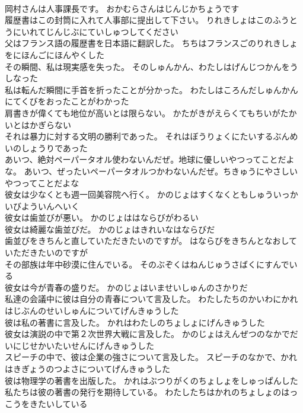 \documentclass[8pt]{extreport}
\begin{document}
\begin{CJK}{UTF8}{min}
\\	岡村さんは人事課長です。	おかむらさんはじんじかちょうです 
\\	履歴書はこの封筒に入れて人事部に提出して下さい。	りれきしょはこのふうとうにいれてじんじぶにていしゅつしてください 
\\	父はフランス語の履歴書を日本語に翻訳した。	ちちはフランスごのりれきしょをにほんごにほんやくした 
\\	その瞬間、私は現実感を失った。	そのしゅんかん、わたしはげんじつかんをうしなった 
\\	私は転んだ瞬間に手首を折ったことが分かった。	わたしはころんだしゅんかんにてくびをおったことがわかった 
\\	肩書きが偉くても地位が高いとは限らない。	かたがきがえらくてもちいがたかいとはかぎらない 
\\	それは暴力に対する文明の勝利であった。	それはぼうりょくにたいするぶんめいのしょうりであった 
\\	あいつ、絶対ペーパータオル使わないんだぜ。地球に優しいやつってことだよな。	あいつ、ぜったいペーパータオルつかわないんだぜ。ちきゅうにやさしいやつってことだよな 
\\	彼女は少なくとも週一回美容院へ行く。	かのじょはすくなくともしゅういっかいびよういんへいく 
\\	彼女は歯並びが悪い。	かのじょははならびがわるい 
\\	彼女は綺麗な歯並びだ。	かのじょはきれいなはならびだ 
\\	歯並びをきちんと直していただきたいのですが。	はならびをきちんとなおしていただきたいのですが 
\\	その部族は年中砂漠に住んでいる。	そのぶぞくはねんじゅうさばくにすんでいる 
\\	彼女は今が青春の盛りだ。	かのじょはいませいしゅんのさかりだ 
\\	私達の会議中に彼は自分の青春について言及した。	わたしたちのかいわにかれはじぶんのせいしゅんについてげんきゅうした 
\\	彼は私の著書に言及した。	かれはわたしのちょしょにげんきゅうした 
\\	彼女は演説の中で第２次世界大戦に言及した。	かのじょはえんぜつのなかでだいにじせかいたいせんにげんきゅうした 
\\	スピーチの中で、彼は企業の強さについて言及した。	スピーチのなかで、かれはきぎょうのつよさについてげんきゅうした 
\\	彼は物理学の著書を出版した。	かれはぶつりがくのちょしょをしゅっぱんした 
\\	私たちは彼の著書の発行を期待している。	わたしたちはかれのちょしょのはっこうをきたいしている 

\end{CJK}
\end{document}
